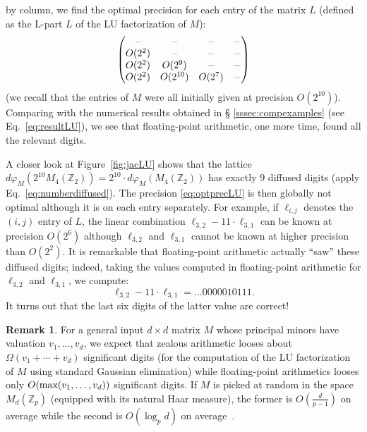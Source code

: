 \documentclass[11pt]{article}
\numberwithin{equation}{section}
\numberwithin{figure}{section}
\theoremstyle{definition}
\newtheorem{rem}[theo]{Remark}
\newcommand{\Z}{\mathbb Z}
\newcommand{\Zp}{\Z_p}
\renewcommand{\max}{\text{\rm max}}
\begin{document}
by column, we find the optimal precision for each entry of the matrix
$L$ (defined as the L-part $L$ of the LU factorization of $M$):
\begin{equation}
\label{eq:optprecLU}
\left(\begin{matrix}
{\color{black!50} -} & {\color{black!50} -} & {\color{black!50} -} & {\color{black!50} -} \\
O(2^2) & {\color{black!50} -} & {\color{black!50} -} & {\color{black!50} -} \\
O(2^2) & O(2^9) & {\color{black!50} -} & {\color{black!50} -} \\
O(2^2) & O(2^{10}) & O(2^7) & {\color{black!50} -} \\
\end{matrix}\right)
\end{equation}
(we recall that the entries of $M$ were all initially given at precision 
$O(2^{10})$). Comparing with the numerical results obtained in \S 
\ref{sssec:compexamples} (see Eq.~\eqref{eq:resultLU}), we see that 
floating-point arithmetic, one more time, found all the relevant 
digits.

A closer look at Figure~\ref{fig:jacLU} shows that the lattice 
$d \varphi_M(2^{10} M_4(\Z_2)) = 
2^{10} \cdot d \varphi_M(M_4(\Z_2))$
has exactly $9$ diffused digits (apply Eq.~\eqref{eq:numberdiffused}).
The precision \eqref{eq:optprecLU} is then globally not optimal although 
it is on each entry separately. For example, if $\ell_{i,j}$ denotes the 
$(i,j)$ entry of $L$, the linear combination $\ell_{3,2} - 11 \cdot 
\ell_{3,1}$ can be known at precision $O(2^6)$ although $\ell_{3,2}$ and
$\ell_{3,1}$ cannot be known at higher precision than $O(2^2)$.
It is remarkable that floating-point arithmetic actually ``saw'' 
these diffused digits; indeed, taking the values computed in
floating-point arithmetic for $\ell_{3,2}$ and $\ell_{3,1}$, we compute:
$$\ell_{3,2} - 11 \cdot \ell_{3,1} = \ldots0000010111.$$
It turns out that the last six digits of the latter value are 
correct!

\begin{rem}
\label{rem:precLU}
For a general input $d \times d$ matrix $M$ whose principal minors have 
valuation $v_1, \ldots, v_d$, we expect that zealous arithmetic looses 
about $\Omega(v_1 + \cdots + v_d)$ significant digits (for the 
computation of the LU factorization of $M$ using standard Gaussian
elimination) while floating-point arithmetics looses only $O(\max(v_1, 
\ldots, v_d))$ significant digits. If $M$ is picked at random in the
space $M_d(\Zp)$ (equipped with its natural Haar measure), the former 
is $O(\frac d{p-1})$ on average while the second is $O(\log_p d)$ on
average~\cite{Ca12}.
\end{rem}
\end{document}
